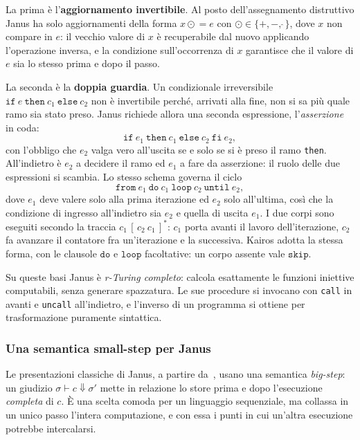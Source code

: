 La prima è l'\textbf{aggiornamento invertibile}. Al posto dell'assegnamento
distruttivo Janus ha solo aggiornamenti della forma $x \mathrel{\odot}= e$ con
$\odot \in \{+,-,\hat{\ }\}$, dove $x$ non compare in $e$: il vecchio valore di
$x$ è recuperabile dal nuovo applicando l'operazione inversa, e la condizione
sull'occorrenza di $x$ garantisce che il valore di $e$ sia lo stesso prima e
dopo il passo.

La seconda è la \textbf{doppia guardia}. Un condizionale irreversibile
$\mathtt{if}\ e\ \mathtt{then}\ c_1\ \mathtt{else}\ c_2$ non è invertibile
perché, arrivati alla fine, non si sa più quale ramo sia stato preso. Janus
richiede allora una seconda espressione, l'\emph{asserzione} in coda:
\[
\mathtt{if}\ e_1\ \mathtt{then}\ c_1\ \mathtt{else}\ c_2\ \mathtt{fi}\ e_2 ,
\]
con l'obbligo che $e_2$ valga vero all'uscita se e solo se si è preso il ramo
\texttt{then}. All'indietro è $e_2$ a decidere il ramo ed $e_1$ a fare da
asserzione: il ruolo delle due espressioni si scambia. Lo stesso schema governa
il ciclo
\[
\mathtt{from}\ e_1\ \mathtt{do}\ c_1\ \mathtt{loop}\ c_2\ \mathtt{until}\ e_2 ,
\]
dove $e_1$ deve valere solo alla prima iterazione ed $e_2$ solo all'ultima, così
che la condizione di ingresso all'indietro sia $e_2$ e quella di uscita $e_1$.
I due corpi sono eseguiti secondo la traccia $c_1\,[\,c_2\ c_1\,]^{*}$: $c_1$
porta avanti il lavoro dell'iterazione, $c_2$ fa avanzare il contatore fra
un'iterazione e la successiva. Kairos adotta la stessa forma, con le clausole
$\mathtt{do}$ e $\mathtt{loop}$ facoltative: un corpo assente vale
$\mathtt{skip}$.

Su queste basi Janus è \emph{r-Turing completo}: calcola esattamente le funzioni
iniettive computabili, senza generare spazzatura. Le sue procedure si invocano
con \texttt{call} in avanti e \texttt{uncall} all'indietro, e l'inverso di un
programma si ottiene per trasformazione puramente sintattica.

\subsubsection{Una semantica small-step per Janus}

Le presentazioni classiche di Janus, a partire da~\cite{YokoyamaGluck2007},
usano una semantica \emph{big-step}: un giudizio $\sigma \vdash c \Downarrow
\sigma'$ mette in relazione lo store prima e dopo l'esecuzione \emph{completa}
di $c$. È una scelta comoda per un linguaggio sequenziale, ma collassa in un
unico passo l'intera computazione, e con essa i punti in cui un'altra
esecuzione potrebbe intercalarsi.

